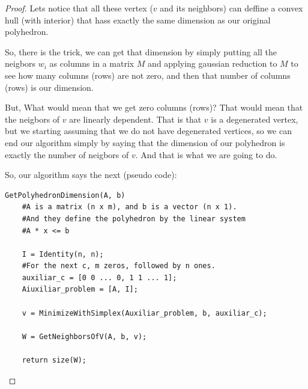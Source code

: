 \begin{proof}
        Lets notice that all these vertex ($v$ and its neighbors) can deffine a convex hull (with interior) that hass exactly the same
        dimension as our original polyhedron.\pn
        
        So, there is the trick, we can get that dimension by simply putting all the neigbors $w_i$ as columns in a matrix $M$ and
        applying gaussian reduction to $M$ to see how many columns (rows) are not zero, and then that number of columns (rows) is our dimension.\pn
        
        But, What would mean that we get zero columns (rows)? That would mean that the neigbors of $v$ are linearly dependent.
        That is that $v$ is a degenerated vertex, but we starting assuming that we do not have degenerated vertices, so we can end
        our algorithm simply by saying that the dimension of our polyhedron is exactly the number of neigbors of $v$. And that is what we are going to do.\pn
        
        So, our algorithm says the next (pseudo code):
        
\begin{lstlisting}
GetPolyhedronDimension(A, b)
    #A is a matrix (n x m), and b is a vector (n x 1).
    #And they define the polyhedron by the linear system
    #A * x <= b
    
    I = Identity(n, n);
    #For the next c, m zeros, followed by n ones.
    auxiliar_c = [0 0 ... 0, 1 1 ... 1];
    Aiuxiliar_problem = [A, I];
    
    v = MinimizeWithSimplex(Auxiliar_problem, b, auxiliar_c);
    
    W = GetNeighborsOfV(A, b, v);
    
    return size(W);
\end{lstlisting}
    \end{proof}